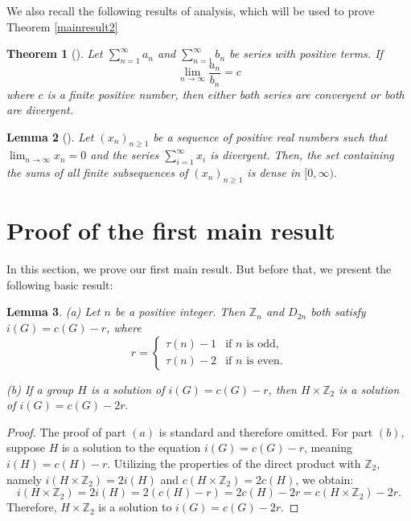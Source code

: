 \documentclass[a4paper,11pt]{amsart}
\numberwithin{equation}{section}
\numberwithin{equation}{subsection}
\newtheorem{theorem}{Theorem}[section]
\newtheorem{lemma}[theorem]{Lemma}
\begin{document}
We also recall the following results of analysis, which will be used to prove Theorem \ref{mainresult2}
\begin{theorem}[]\label{limit test} 
    Let $\sum_{n=1}^\infty a_n$ and $\sum_{n=1}^{\infty} b_n$ be series with positive terms. If $$\lim_{n\to \infty} \frac{a_{n}}{b_{n}}=c$$ where $c$ is a finite positive number, then either both series are convergent or both are divergent.
\end{theorem}

\begin{lemma}[]\label{denseness result} 
     Let $(x_n)_{n\geq 1}$ be a sequence of positive real numbers such that $\lim_{n\to \infty} x_{n}=0$ and the series $\sum _{i=1}^{\infty} x_{i} $ is divergent. Then, the set containing the sums of all finite subsequences of $(x_{n})_{n\geq 1}$ is dense in $[0,\infty).$
\end{lemma}

\section{Proof of the first main result}
In this section, we prove our first main result.
But before that, we present the following basic result:
\begin{lemma}\label{basic results 1}
    (a) Let $n$ be a positive integer. Then $\mathbb{Z}_n$ and $D_{2n}$ both satisfy $i(G)=c(G)-r$, where 
    \begin{equation*}
        r=
        \begin{cases} 
       \tau(n)-1 & \text{if } n \text{ is odd,} \\
      \tau(n)-2 & \text{if } n \text{ is even.}
   \end{cases}
    \end{equation*}
    
    (b) If a group $H$ is a solution of $i(G)=c(G)-r$, then $H\times \mathbb{Z}_2$ is a solution of $i(G)=c(G)-2r.$ 
\end{lemma}
\begin{proof}
    The proof of part $(a)$ is standard and therefore omitted. For part $(b)$, suppose $H$ is a solution to the equation $i(G) = c(G) - r$, meaning $i(H) = c(H) - r$. Utilizing the properties of the direct product with $\mathbb{Z}_2$, namely $i(H \times \mathbb{Z}_2) = 2i(H)$ and $c(H \times \mathbb{Z}_2) = 2c(H)$, we obtain:
\[
i(H \times \mathbb{Z}_2) = 2i(H) = 2(c(H) - r) = 2c(H) - 2r = c(H \times \mathbb{Z}_2) - 2r.
\]
Therefore, $H \times \mathbb{Z}_2$ is a solution to $i(G) = c(G) - 2r$.
\end{proof}
\end{document}
